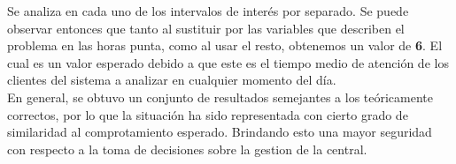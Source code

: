 \documentclass{article}
\begin{document}
			Se analiza en cada uno de los intervalos de interés por separado. Se puede observar entonces que tanto al sustituir por las variables que describen el problema en las horas punta, como al usar el resto, obtenemos un valor de \textbf{6}. El cual es un valor esperado debido a que este es el tiempo medio de atención de los clientes
			del sistema a analizar en cualquier momento del día.
			\\
			
	En general, se obtuvo un conjunto de resultados semejantes a los teóricamente correctos, por lo que la situación ha sido representada con cierto grado de similaridad al comprotamiento esperado. Brindando esto una mayor seguridad con respecto a la toma de decisiones sobre la gestion de la central.
			
			
			
			
			
			
			
		
\end{document}
